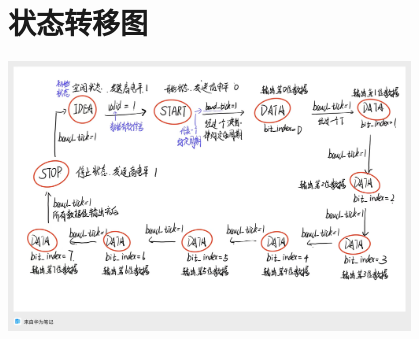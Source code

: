 \documentclass{article} %
\begin{document}
\section{状态转移图}
\includegraphics[width=0.8\textwidth]{22.jpg}\par
\end{document}
